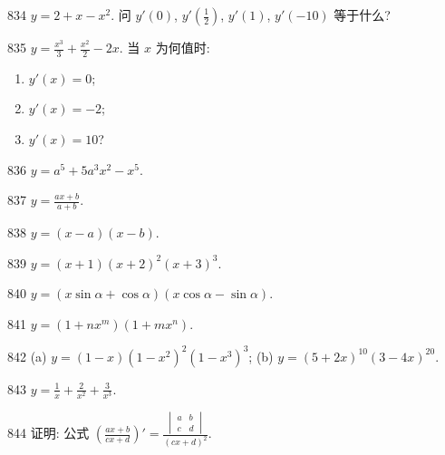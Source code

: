 
\begin{prob}[S]{834}
$y = 2 + x - x^2$. 问 $y'(0)$, $y'\left(\frac{1}{2}\right)$, $y'(1)$, $y'(-10)$ 等于什么?
\end{prob}

\begin{prob}[L]{835}
$y = \frac{x^3}{3} + \frac{x^2}{2} - 2x$. 当 $x$ 为何值时:
\begin{enumerate}[label=(\alph*), itemsep=2pt, topsep=3pt]
\item $y'(x) = 0$;
\item $y'(x) = -2$;
\item $y'(x) = 10$?
\end{enumerate}
\end{prob}

\begin{prob}[S]{836}
$y = a^5 + 5a^3x^2 - x^5$.
\end{prob}

\begin{prob}[S]{837}
$y = \frac{ax + b}{a + b}$.
\end{prob}

\begin{prob}[S]{838}
$y = (x - a)(x - b)$.
\end{prob}

\begin{prob}[S]{839}
$y = (x + 1)(x + 2)^2(x + 3)^3$.
\end{prob}

\begin{prob}[S]{840}
$y = (x\sin\alpha + \cos\alpha)(x\cos\alpha - \sin\alpha)$.
\end{prob}

\begin{prob}[S]{841}
$y = (1 + nx^m)(1 + mx^n)$.
\end{prob}

\begin{prob}[M]{842}
(a) $y = (1 - x)(1 - x^2)^2(1 - x^3)^3$; \qquad (b) $y = (5 + 2x)^{10}(3 - 4x)^{20}$.
\end{prob}

\begin{prob}[S]{843}
$y = \frac{1}{x} + \frac{2}{x^2} + \frac{3}{x^3}$.
\end{prob}

\begin{prob}[M]{844}
证明: 公式 $\left(\frac{ax + b}{cx + d}\right)' = \frac{\begin{vmatrix} a & b \\ c & d \end{vmatrix}}{(cx + d)^2}$.
\end{prob}

